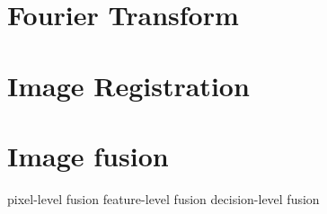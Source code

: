 \section{Fourier Transform}

\section{Image Registration}

\section{Image fusion}

pixel-level fusion
feature-level fusion
decision-level fusion